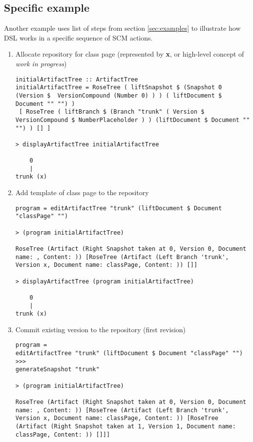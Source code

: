 \documentclass[11pt]{article}
\begin{document}
\subsection{Specific example}
Another example uses list of steps from section \ref{sec:examples} to illustrate how DSL works in a specific sequence of SCM actions.
\begin{enumerate}
\item Allocate repository for class page (represented by \textbf{x}, or high-level concept of \textit{work in progress})
\begin{lstlisting}
initialArtifactTree :: ArtifactTree 
initialArtifactTree = RoseTree ( liftSnapshot $ (Snapshot 0 (Version $  VersionCompound (Number 0) ) ) ( liftDocument $ Document "" "") ) 
 [ RoseTree ( liftBranch $ (Branch "trunk" ( Version $ VersionCompound $ NumberPlaceholder ) ) (liftDocument $ Document "" "") ) [] ]
 
> displayArtifactTree initialArtifactTree 

    0    
    |    
trunk (x)
 \end{lstlisting}
\item Add template of class page to the repository
\begin{lstlisting}
program = editArtifactTree "trunk" (liftDocument $ Document "classPage" "") 

> (program initialArtifactTree)

RoseTree (Artifact (Right Snapshot taken at 0, Version 0, Document name: , Content: )) [RoseTree (Artifact (Left Branch 'trunk', Version x, Document name: classPage, Content: )) []]

> displayArtifactTree (program initialArtifactTree)

    0    
    |    
trunk (x)

\end{lstlisting}
\item Commit existing version to the repository (first revision)

\begin{lstlisting}
program = 
editArtifactTree "trunk" (liftDocument $ Document "classPage" "") >>> 
generateSnapshot "trunk"

> (program initialArtifactTree)

RoseTree (Artifact (Right Snapshot taken at 0, Version 0, Document name: , Content: )) [RoseTree (Artifact (Left Branch 'trunk', Version x, Document name: classPage, Content: )) [RoseTree (Artifact (Right Snapshot taken at 1, Version 1, Document name: classPage, Content: )) []]]



\end{lstlisting}
\end{enumerate}
\end{document}
